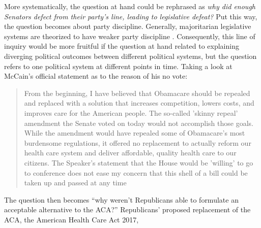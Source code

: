 \documentclass[11pt]{article}
\begin{document}
More systematically, the question at hand could be rephrased as \textit{why did enough Senators defect from their party's line, leading to legislative defeat?} Put this way, the question becomes about party discipline. Generally, majoritarian legislative systems are theorized to have weaker party discipline \parencite[see e.g.][]{Kem2014}. Consequently, this line of inquiry would be more fruitful if the question at hand related to explaining diverging political outcomes between different political systems, but the question refers to one political system at different points in time. Taking a look at McCain's official statement as to the reason of his no vote:

\begin{quote}
  From the beginning, I have believed that Obamacare should be repealed and replaced with a solution that increases competition, lowers costs, and improves care for the American people. The so-called 'skinny repeal' amendment the Senate voted on today would not accomplish those goals. While the amendment would have repealed some of Obamacare's most burdensome regulations, it offered no replacement to actually reform our health care system and deliver affordable, quality health care to our citizens. The Speaker's statement that the House would be 'willing' to go to conference does not ease my concern that this shell of a bill could be taken up and passed at any time \parencite[][]{QUELLE}
\end{quote}

The question then becomes \enquote{why weren't Republicans able to formulate an acceptable alternative to the ACA?} Republicans' proposed replacement of the ACA, the American Health Care Act 2017,
\end{document}
